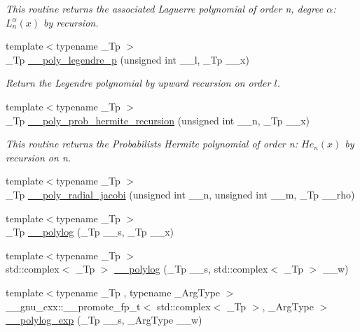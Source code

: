 \begin{DoxyCompactItemize}
\begin{DoxyCompactList}\small\item\em This routine returns the associated Laguerre polynomial of order {\ttfamily n}, degree {\ttfamily $ \alpha $}\+: $ L_n^\alpha(x) $ by recursion. \end{DoxyCompactList}\item 
{\footnotesize template$<$typename \+\_\+\+Tp $>$ }\\\+\_\+\+Tp \hyperlink{namespacestd_1_1____detail_ad340d3fb1a429356292e7dcf61348c8a}{\+\_\+\+\_\+poly\+\_\+legendre\+\_\+p} (unsigned int \+\_\+\+\_\+l, \+\_\+\+Tp \+\_\+\+\_\+x)
\begin{DoxyCompactList}\small\item\em Return the Legendre polynomial by upward recursion on order $ l $. \end{DoxyCompactList}\item 
{\footnotesize template$<$typename \+\_\+\+Tp $>$ }\\\+\_\+\+Tp \hyperlink{namespacestd_1_1____detail_a1b0aa7013a14cde1ff7585c61b412756}{\+\_\+\+\_\+poly\+\_\+prob\+\_\+hermite\+\_\+recursion} (unsigned int \+\_\+\+\_\+n, \+\_\+\+Tp \+\_\+\+\_\+x)
\begin{DoxyCompactList}\small\item\em This routine returns the Probabilists Hermite polynomial of order n\+: $ He_n(x) $ by recursion on n. \end{DoxyCompactList}\item 
{\footnotesize template$<$typename \+\_\+\+Tp $>$ }\\\+\_\+\+Tp \hyperlink{namespacestd_1_1____detail_af325d47042bc9661bbde61b13f368fec}{\+\_\+\+\_\+poly\+\_\+radial\+\_\+jacobi} (unsigned int \+\_\+\+\_\+n, unsigned int \+\_\+\+\_\+m, \+\_\+\+Tp \+\_\+\+\_\+rho)
\item 
{\footnotesize template$<$typename \+\_\+\+Tp $>$ }\\\+\_\+\+Tp \hyperlink{namespacestd_1_1____detail_a17fb8cea11706f319aaea277188a29c8}{\+\_\+\+\_\+polylog} (\+\_\+\+Tp \+\_\+\+\_\+s, \+\_\+\+Tp \+\_\+\+\_\+x)
\item 
{\footnotesize template$<$typename \+\_\+\+Tp $>$ }\\std\+::complex$<$ \+\_\+\+Tp $>$ \hyperlink{namespacestd_1_1____detail_aa14e3ca6e4bee5ac1f1e5e1c2cee1d5a}{\+\_\+\+\_\+polylog} (\+\_\+\+Tp \+\_\+\+\_\+s, std\+::complex$<$ \+\_\+\+Tp $>$ \+\_\+\+\_\+w)
\item 
{\footnotesize template$<$typename \+\_\+\+Tp , typename \+\_\+\+Arg\+Type $>$ }\\\+\_\+\+\_\+gnu\+\_\+cxx\+::\+\_\+\+\_\+promote\+\_\+fp\+\_\+t$<$ std\+::complex$<$ \+\_\+\+Tp $>$, \+\_\+\+Arg\+Type $>$ \hyperlink{namespacestd_1_1____detail_a31327d726731b1aad5502da2fb93b0e9}{\+\_\+\+\_\+polylog\+\_\+exp} (\+\_\+\+Tp \+\_\+\+\_\+s, \+\_\+\+Arg\+Type \+\_\+\+\_\+w)

\end{DoxyCompactItemize}
